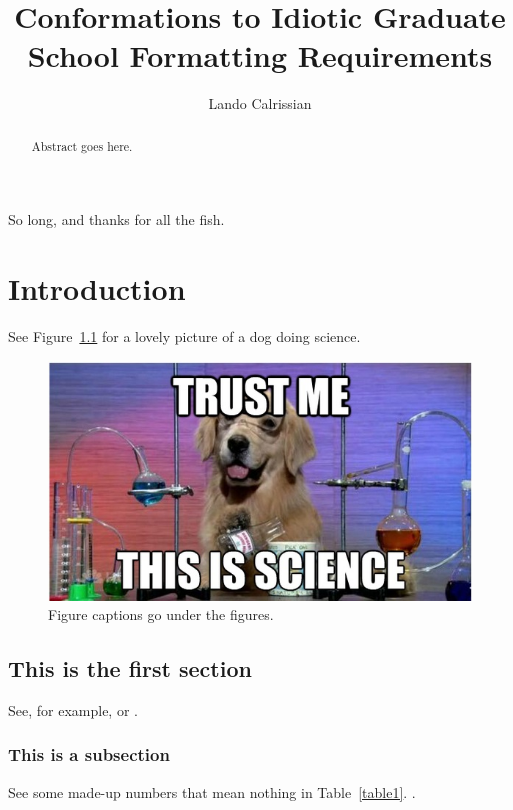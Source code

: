 \documentclass[nosmallcaps]{csuthesis}
\title{Conformations to Idiotic Graduate School Formatting Requirements}
\author{Lando Calrissian}
\begin{document}
\frontmatter

\begin{abstract}
Abstract goes here.
\end{abstract}

\begin{acknowledgements}
So long, and thanks for all the fish. 
\end{acknowledgements}

\maketitle
\tableofcontents
\cleardoublepage
\listoftables
\listoffigures

\mainmatter
\chapter{Introduction}
\lipsum[1] 

See Figure~\ref{dog} for a lovely picture of a dog doing science. \lipsum[2]

\begin{figure}[htbp]
\includegraphics{science-dog.jpg}
\caption{Figure captions go under the figures.} \label{dog}
\end{figure}

\section{{This is the first section}} 
\lipsum[3] See, for example, \cite{Item1, Item2, Item3, Item4} or \cite{Item5, Item6, Item7, Item8, Item9, Item10, Item11}. \lipsum[4]

\subsection{This is a subsection}
See some made-up numbers that mean nothing in Table~\ref{table1}. \lipsum[4-5].
\end{document}
